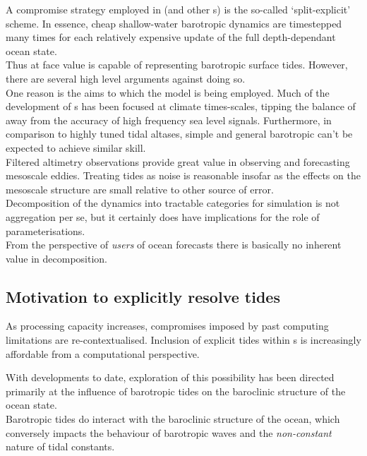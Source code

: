 A compromise strategy employed in \MOM{} (and other \OGCM{}s) is the so-called `split-explicit' scheme.    
In essence, cheap shallow-water barotropic dynamics are timestepped many times for each relatively expensive update of the full depth-dependant ocean state.  \\
Thus \MOM{} at face value is capable of representing barotropic surface tides.   However, there are several high level arguments against doing so.\\
One reason is the aims to which the model is being employed.  Much of the development of \OGCM{}s has been focused at climate times-scales, tipping the balance of away from the accuracy of high frequency sea level signals.   
Furthermore, in comparison to highly tuned tidal altases, simple and general barotropic can't be expected to achieve similar skill.\\

Filtered altimetry observations provide great value in observing and forecasting mesoscale eddies.
Treating tides as noise is reasonable insofar as the effects on the mesoscale structure are small relative to other source of error.\\

Decomposition of the dynamics into tractable categories for simulation is not aggregation per se, but it certainly does have implications for the role of parameterisations.  \\

From the perspective of \emph{users} of ocean forecasts there is basically no inherent value in decomposition.   
 
\subsection{Motivation to explicitly resolve tides}

As processing capacity increases, compromises imposed by past computing limitations are re-contextualised.   Inclusion of explicit tides within \OGCM{}s is increasingly affordable from a computational perspective.

With developments to date, exploration of this possibility has been directed primarily at the influence of barotropic tides on the baroclinic structure of the ocean state.   \\


Barotropic tides do interact with the baroclinic structure of the ocean, which conversely impacts the behaviour of barotropic waves and the \emph{non-constant} \citep{Ray:2010jm} nature of tidal constants.\\


